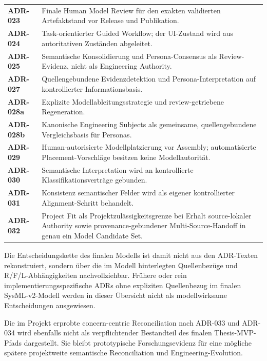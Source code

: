 \begin{xltabular}{\textwidth}{@{}p{1.6cm}X@{}}
\textbf{ADR-023} &
Finale Human Model Review für den exakten validierten Artefaktstand vor Release und Publikation.\\

\textbf{ADR-024} &
Task-orientierter Guided Workflow; der UI-Zustand wird aus autoritativen Zuständen abgeleitet.\\

\textbf{ADR-025} &
Semantische Konsolidierung und Persona-Consensus als Review-Evidenz, nicht als Engineering Authority.\\

\textbf{ADR-027} &
Quellengebundene Evidenzdetektion und Persona-Interpretation auf kontrollierter Informationsbasis.\\

\textbf{ADR-028a} &
Explizite Modellableitungsstrategie und review-getriebene Regeneration.\\

\textbf{ADR-028b} &
Kanonische Engineering Subjects als gemeinsame, quellengebundene Vergleichsbasis für Personas.\\

\textbf{ADR-029} &
Human-autorisierte Modellplatzierung vor Assembly; automatisierte Placement-Vorschläge besitzen keine Modellautorität.\\

\textbf{ADR-030} &
Semantische Interpretation wird an kontrollierte Klassifikationsverträge gebunden.\\

\textbf{ADR-031} &
Konsistenz semantischer Felder wird als eigener kontrollierter Alignment-Schritt behandelt.\\

\textbf{ADR-032} &
Project Fit als Projektzulässigkeitsgrenze bei Erhalt source-lokaler Authority sowie provenance-gebundener Multi-Source-Handoff in genau ein Model Candidate Set.\\

\hline
\end{xltabular}
\endgroup

Die Entscheidungskette des finalen Modells ist damit nicht aus den ADR-Texten
rekonstruiert, sondern über die im Modell hinterlegten Quellenbezüge und
R/F/L-Abhängigkeiten nachvollziehbar. Frühere oder rein
implementierungsspezifische ADRs ohne expliziten Quellenbezug im finalen
SysML-v2-Modell werden in dieser Übersicht nicht als modellwirksame
Entscheidungen ausgewiesen.

Die im Projekt erprobte concern-centric Reconciliation nach ADR-033 und ADR-034
wird ebenfalls nicht als verpflichtender Bestandteil des finalen
Thesis-MVP-Pfads dargestellt. Sie bleibt prototypische Forschungsevidenz für
eine mögliche spätere projektweite semantische Reconciliation und
Engineering-Evolution.

